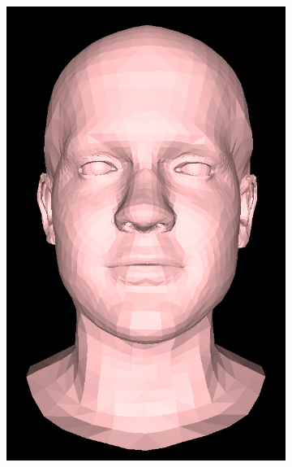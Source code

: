 \begin{figure}[h!]
\begin{subfigure}[b]{0.19\textwidth}
        \includegraphics[width=\textwidth]{figures/gen_sample/00013.png}
    \end{subfigure}
    \begin{subfigure}[b]{0.19\textwidth}

\end{subfigure}
\end{figure}
